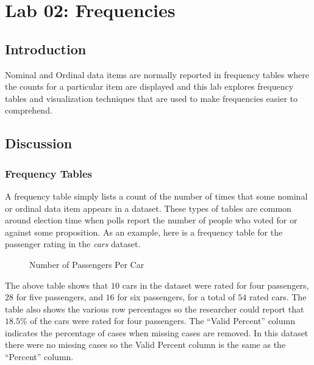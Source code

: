 \chapter{Lab 02: Frequencies}\label{ch:lab02}

\section{Introduction}

Nominal and Ordinal data items are normally reported in frequency tables where the counts for a particular item are displayed and this lab explores frequency tables and visualization techniques that are used to make frequencies easier to comprehend.

\section{Discussion}

\subsection{Frequency Tables}

A frequency table simply lists a count of the number of times that some nominal or ordinal data item appears in a dataset. These types of tables are common around election time when polls report the number of people who voted for or against some proposition. As an example, here is a frequency table for the passenger rating in the \textit{cars} dataset.

\begin{figure}[H]
  \begin{center}
    \caption{Number of Passengers Per Car}
    \label{lab02_fig01}    
  \end{center}
\end{figure}

The above table shows that $ 10 $ cars in the dataset were rated for four passengers, $ 28 $ for five passengers, and $ 16 $ for six passengers, for a total of $ 54 $ rated cars. The table also shows the various row percentages so the researcher could report that $ 18.5\% $ of the cars were rated for four passengers. The ``Valid Percent'' column indicates the percentage of cases when missing cases are removed. In this dataset there were no missing cases so the Valid Percent column is the same as the ``Percent'' column.

